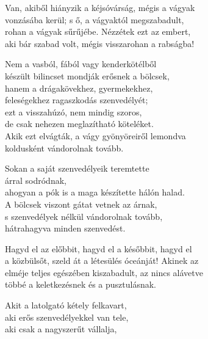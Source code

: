\begin{dhpverse}

 Van, akiből hiányzik a kéjsóvárság, mégis a vágyak\\
vonzásába kerül; s ő, a vágyaktól megszabadult,\\
rohan a vágyak sűrűjébe. Nézzétek ezt az embert,\\
aki bár szabad volt, mégis visszarohan a rabságba!

  Nem a vasból, fából vagy kenderkötélből\\
készült bilincset mondják erősnek a bölcsek,\\
hanem a drágakövekhez, gyermekekhez,\\
feleségekhez ragaszkodás szenvedélyét;\\
ezt a visszahúzó, nem mindig szoros,\\
de csak nehezen meglazítható köteléket.\\
Akik ezt elvágták, a vágy gyönyöreiről lemondva\\
koldusként vándorolnak tovább.

 Sokan a saját szenvedélyeik teremtette\\
árral sodródnak,\\
ahogyan a pók is a maga készítette hálón halad.\\
A bölcsek viszont gátat vetnek az árnak,\\
s szenvedélyek nélkül vándorolnak tovább,\\
hátrahagyva minden szenvedést.

 Hagyd el az előbbit, hagyd el a későbbit, hagyd el\\
a közbülsőt, szeld át a létesülés óceánját! Akinek az\\
elméje teljes egészében kiszabadult, az nincs alávetve\\
többé a keletkezésnek és a pusztulásnak.

 Akit a latolgató kétely felkavart,\\
aki erős szenvedélyekkel van tele,\\
aki csak a nagyszerűt vállalja,\\

\end{dhpverse}
\newpage
